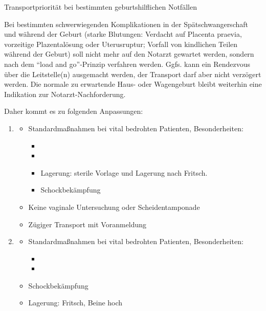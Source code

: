 \documentclass[
ngerman,
paper=a4,
asymmetric,
fontsize=10pt,
headings=small,
draft=false,
openany,
numbers=noenddot,
bibtotocnumbered,
footnotes=multiple,
toc=flat,
]{scrreprt}
\begin{document}
\Text
{Transportpriorität bei bestimmten geburtshilflichen Notfällen}
{
\SlideHeading{}
  Bei bestimmten schwerwiegenden Komplikationen in der
  Spätschwangerschaft und während der Geburt (starke
  Blutungen: Verdacht auf Placenta praevia, vorzeitige
  Plazentalösung oder Uterusruptur; Vorfall von kindlichen
  Teilen während der Geburt)
soll nicht mehr auf den Notarzt gewartet werden, sondern
nach dem \enquote{load and go}-Prinzip verfahren werden.
Ggfs.
kann ein Rendezvous über die Leitstelle(n) ausgemacht
werden, der Transport darf aber nicht verzögert werden.
Die normale zu erwartende Haus- oder Wagengeburt bleibt
weiterhin eine Indikation zur Notarzt-Nachforderung.

Daher kommt es zu folgenden Anpassungen:
 
\begin{enumerate}
  \item  {} 
  
  \begin{itemize}
    \item %
    Standardmaßnahmen bei vital bedrohten Patienten, Besonderheiten:
    \begin{itemize}
      \item {}
      \item {}
      \item Lagerung: sterile Vorlage und Lagerung nach Fritsch.
      \item Schockbekämpfung
    \end{itemize}
    \item Keine vaginale Untersuchung oder  Scheidentamponade
    \item Zügiger Transport mit Voranmeldung
  \end{itemize}
  \item {} 
  
  \begin{itemize}
	\item
    Standardmaßnahmen bei vital bedrohten Patienten, Besonderheiten:
    \begin{itemize}
      \item {}
      \item {}
    \end{itemize}
	\item Schockbekämpfung
	\item Lagerung: Fritsch, Beine hoch
  \end{itemize}
\end{enumerate}
}
{}
{}
{}
{}
\end{document}
